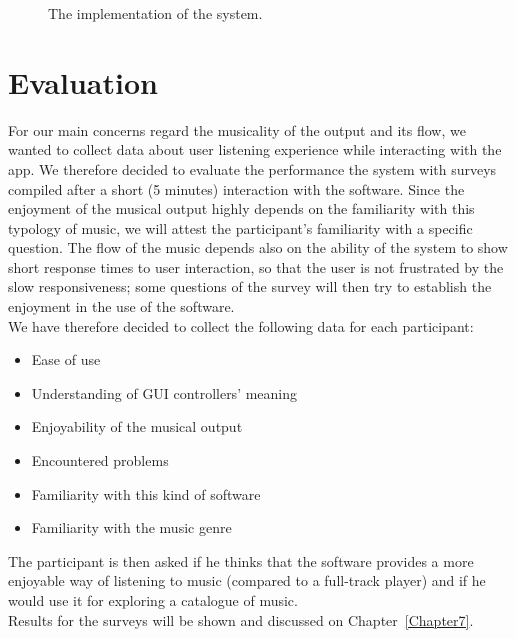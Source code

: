 \begin{figure}[bt]
\caption{The implementation of the system.}
\label{fig:extraction}
\end{figure}

\section{Evaluation}
\label{sec:evaluation_idea}
For our main concerns regard the musicality of the output and its flow, we wanted to collect data about user listening experience while interacting with the app. We therefore decided to evaluate the performance the system with surveys compiled after a short (5 minutes) interaction with the software. Since the enjoyment of the musical output highly depends on the familiarity with this typology of music, we will attest the participant's familiarity with a specific question. The flow of the music depends also on the ability of the system to show short response times to user interaction, so that the user is not frustrated by the slow responsiveness; some questions of the survey will then try to establish the enjoyment in the use of the software.\\
We have therefore decided to collect the following data for each participant:
\begin{itemize}
\item Ease of use
\item Understanding of GUI controllers' meaning
\item Enjoyability of the musical output
\item Encountered problems
\item Familiarity with this kind of software
\item Familiarity with the music genre 
\end{itemize}

The participant is then asked if he thinks that the software provides a more enjoyable way of listening to music (compared to a full-track player) and if he would use it for exploring a catalogue of music. \\
Results for the surveys will be shown and discussed on Chapter~\ref{Chapter7}.